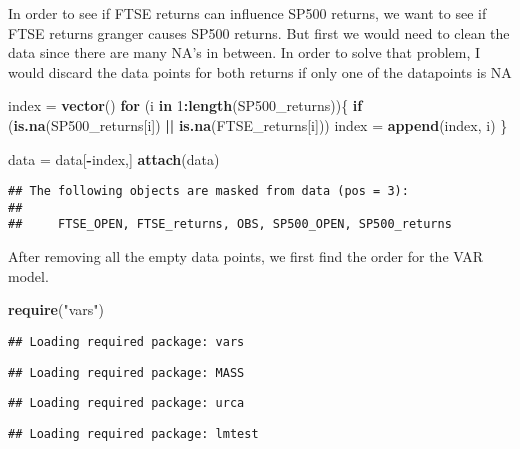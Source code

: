 \documentclass[]{article}
\newenvironment{Shaded}{\begin{snugshade}}{\end{snugshade}}
\newcommand{\KeywordTok}[1]{\textcolor[rgb]{0.13,0.29,0.53}{\textbf{#1}}}
\newcommand{\DecValTok}[1]{\textcolor[rgb]{0.00,0.00,0.81}{#1}}
\newcommand{\StringTok}[1]{\textcolor[rgb]{0.31,0.60,0.02}{#1}}
\newcommand{\ControlFlowTok}[1]{\textcolor[rgb]{0.13,0.29,0.53}{\textbf{#1}}}
\newcommand{\OperatorTok}[1]{\textcolor[rgb]{0.81,0.36,0.00}{\textbf{#1}}}
\newcommand{\NormalTok}[1]{#1}
\begin{document}
In order to see if FTSE returns can influence SP500 returns, we want to
see if FTSE returns granger causes SP500 returns. But first we would
need to clean the data since there are many NA's in between. In order to
solve that problem, I would discard the data points for both returns if
only one of the datapoints is NA

\begin{Shaded}
\begin{Highlighting}[]
\NormalTok{index =}\StringTok{ }\KeywordTok{vector}\NormalTok{()}
\ControlFlowTok{for}\NormalTok{ (i }\ControlFlowTok{in} \DecValTok{1}\OperatorTok{:}\KeywordTok{length}\NormalTok{(SP500_returns))\{}
  \ControlFlowTok{if}\NormalTok{ (}\KeywordTok{is.na}\NormalTok{(SP500_returns[i]) }\OperatorTok{||}\StringTok{ }\KeywordTok{is.na}\NormalTok{(FTSE_returns[i]))}
\NormalTok{    index =}\StringTok{ }\KeywordTok{append}\NormalTok{(index, i)}
\NormalTok{\}}

\NormalTok{data =}\StringTok{ }\NormalTok{data[}\OperatorTok{-}\NormalTok{index,]}
\KeywordTok{attach}\NormalTok{(data)}
\end{Highlighting}
\end{Shaded}

\begin{verbatim}
## The following objects are masked from data (pos = 3):
## 
##     FTSE_OPEN, FTSE_returns, OBS, SP500_OPEN, SP500_returns
\end{verbatim}

After removing all the empty data points, we first find the order for
the VAR model.

\begin{Shaded}
\begin{Highlighting}[]
\KeywordTok{require}\NormalTok{(}\StringTok{"vars"}\NormalTok{)}
\end{Highlighting}
\end{Shaded}

\begin{verbatim}
## Loading required package: vars
\end{verbatim}

\begin{verbatim}
## Loading required package: MASS
\end{verbatim}

\begin{verbatim}
## Loading required package: urca
\end{verbatim}

\begin{verbatim}
## Loading required package: lmtest
\end{verbatim}
\end{document}
